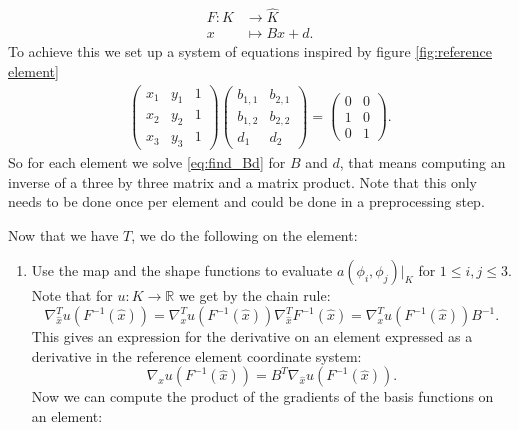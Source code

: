 \documentclass[../Main/main.tex]{subfiles}
\begin{document}
\begin{enumerate}
		\begin{equation}
			\begin{aligned}
				F: K &\rightarrow \hat{K}\\
				x &\mapsto B x + d.
			\end{aligned}
		\end{equation}
		To achieve this we set up a system of equations inspired by figure \ref{fig:reference element}
		\begin{gather}\label{eq:find_Bd}
			\begin{pmatrix}
				x_1 & y_1 & 1\\ 
				x_2 & y_2 & 1\\ 
				x_3 & y_3 & 1
			\end{pmatrix}\begin{pmatrix}
				b_{1,1} & b_{2,1}\\ 
				b_{1,2} & b_{2,2}\\ 
				d_1 & d_2
			\end{pmatrix}=
			\begin{pmatrix}
				0 &0 \\ 
				1& 0\\ 
				0 &1 
			\end{pmatrix}.
		\end{gather}
		So for each element we solve \eqref{eq:find_Bd} for $B$ and $d$, that means computing an inverse of a three by three matrix and a matrix product. Note that this only needs to be done once per element and could be done in a preprocessing step. \par
		Now that we have $T$, we do the following on the element:
		\begin{enumerate}
					\item Use the map and the shape functions to evaluate $a(\phi_i,\phi_j)|_K$  for $1\leq i,j \leq 3$. Note that for $u: K \rightarrow \mathbb{R}$ we get by the chain rule:
			\begin{equation}
				\nabla^T_{\hat{x}} u(F^{-1}(\hat{x})) = \nabla^T_{x}u(F^{-1}(\hat{x}))\nabla^T_{\hat{x}} F^{-1}(\hat{x}) =\nabla^T_{x}u(F^{-1}(\hat{x})) B^{-1}.
			\end{equation}
			This gives an expression for the derivative on an element expressed as a derivative in the reference element coordinate system:
			\begin{equation}
				\nabla_{x}u(F^{-1}(\hat{x})) = B^T \nabla_{\hat{x}} u(F^{-1}(\hat{x})).
			\end{equation}
			Now we can compute the product of the gradients of the basis functions on an element:

\end{enumerate}
\end{enumerate}
\end{document}
